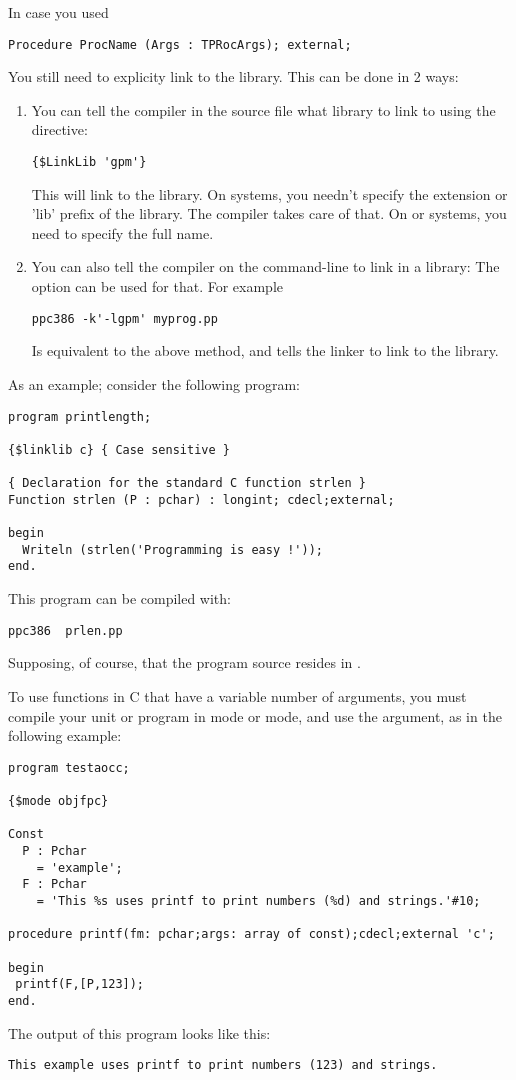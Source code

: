 In case you used
\begin{verbatim}
Procedure ProcName (Args : TPRocArgs); external;
\end{verbatim}
You still need to explicity link to the library. This can be done in 2 ways:
\begin{enumerate}
\item You can tell the compiler in the source file what library to link to
using the  directive:
\begin{verbatim}
{$LinkLib 'gpm'}
\end{verbatim}
This will link to the  library. On \linux systems, you needn't
specify the extension or 'lib' prefix of the library. The compiler takes
care of that. On \dos or \windows systems, you need to specify the full
name.
\item You can also tell the compiler on the command-line to link in a
library: The  option can be used for that. For example
\begin{verbatim}
ppc386 -k'-lgpm' myprog.pp
\end{verbatim}
Is equivalent to the above method, and tells the linker to link to the
 library.
\end{enumerate}

As an example; consider the following program:
\begin{verbatim}
program printlength;

{$linklib c} { Case sensitive }

{ Declaration for the standard C function strlen }
Function strlen (P : pchar) : longint; cdecl;external;

begin
  Writeln (strlen('Programming is easy !'));
end.
\end{verbatim}
This program can be compiled with:
\begin{verbatim}
ppc386  prlen.pp
\end{verbatim}
Supposing, of course, that the program source resides in .

To use functions in C that have a variable number of arguments, you must
compile your unit or program in  mode or  mode,
and use the  argument, as in the following example:

\begin{verbatim}
program testaocc;

{$mode objfpc}

Const
  P : Pchar
    = 'example';
  F : Pchar
    = 'This %s uses printf to print numbers (%d) and strings.'#10;

procedure printf(fm: pchar;args: array of const);cdecl;external 'c';

begin
 printf(F,[P,123]);
end.
\end{verbatim}
The output of this program looks like this:
\begin{verbatim}
This example uses printf to print numbers (123) and strings.
\end{verbatim}

